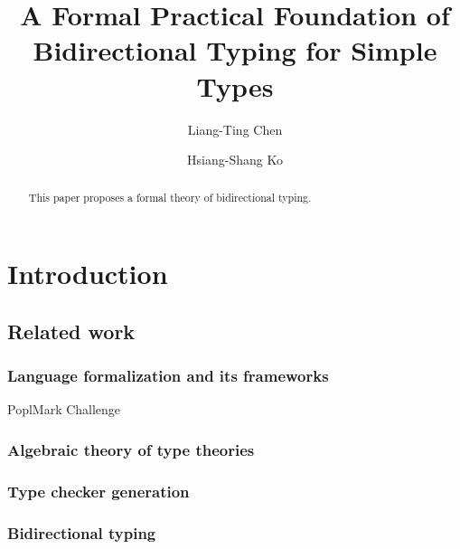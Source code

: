 \documentclass[acmsmall,screen]{acmart}
\theoremstyle{acmdefinition}
\begin{document}
\author{Liang-Ting Chen}
\author{Hsiang-Shang Ko}


\title{A Formal Practical Foundation of Bidirectional Typing for Simple Types}

\begin{abstract}
  This paper proposes a formal theory of bidirectional typing.
\end{abstract}

\maketitle

\section{Introduction}\label{sec:intro}


\subsection{Related work}

\citep{Xie2018}
\subsubsection{Language formalization and its frameworks}
\cite{Wadler2022}
PoplMark Challenge~\citep{Aydemir2005}

\cite{Cimini2020,Cimini2022}
\citep{Fiore2022}
\cite{Allais2021,Gheri2020,Ahrens2022}

\subsubsection{Algebraic theory of type theories}
\cite{Fiore1999,Fiore2022,Ahrens2021,Arkor2020,Hamana2011}


\subsubsection{Type checker generation}
\cite{Gast2004,Grewe2015,Pacak2020,Cimini2020}

\subsubsection{Bidirectional typing}
\cite{Pierce2000}
\cite{Dunfield2021}
\end{document}
